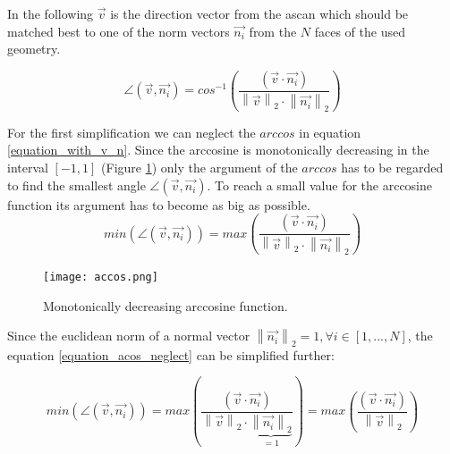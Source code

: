 \qquad

In the following $\overrightarrow{v}$ is the direction vector from the \ac{ascan} which should be matched best to one of the norm vectors $\overrightarrow{n_i}$ from the $N$ faces of the used geometry.


\begin{equation}
\angle (\overrightarrow{v},\overrightarrow{n_i}) =  cos^{-1}\left (    \frac{(\overrightarrow{v} \cdot \overrightarrow{n_i})}{\left \| \overrightarrow{v} \right \|_2  \cdot {\left \| \overrightarrow{n_i} \right \|_2}}  \right ) 
\label{equation_with_v_n}
\end{equation}



For the first simplification we can neglect the $arccos$ in equation \ref{equation_with_v_n}. Since the arccosine is monotonically decreasing in the interval $[-1,1]$ (Figure \ref{accos_figure}) only the argument of the $arccos$ has to be regarded to find the smallest angle $\angle (\overrightarrow{v},\overrightarrow{n_i})$. To reach a small value for the arccosine function its argument has to become as big as possible.
\begin{equation}
min \left (  \angle (\overrightarrow{v},\overrightarrow{n_i}) \right ) =  max \left (    \frac{(\overrightarrow{v} \cdot \overrightarrow{n_i})}{\left \| \overrightarrow{v} \right \|_2  \cdot {\left \| \overrightarrow{n_i} \right \|_2}}  \right ) 
\label{equation_acos_neglect}
\end{equation}

\begin{figure}[H]
    \centering
    \texttt{[image: accos.png]}
    \caption{ Monotonically decreasing arccosine function.}
    \label{accos_figure}
\end{figure}

Since the euclidean norm of a normal vector $\left \| \overrightarrow{n_i} \right \|_2 = 1 , \forall i \in [1,...,N]$, the equation \ref{equation_acos_neglect} can be simplified further:


\begin{equation}
min \left (  \angle (\overrightarrow{v},\overrightarrow{n_i}) \right ) =  max \left (    \frac{(\overrightarrow{v} \cdot \overrightarrow{n_i})}{\left \| \overrightarrow{v} \right \|_2  \cdot { \underset{=1}{\underbrace{\left \| \overrightarrow{n_i} \right \|_2}}} }  \right ) = 
max \left (    \frac{(\overrightarrow{v} \cdot \overrightarrow{n_i})}{\left \| \overrightarrow{v} \right \|_2  }  \right )
\label{equation_acos_norm_simply}
\end{equation}

